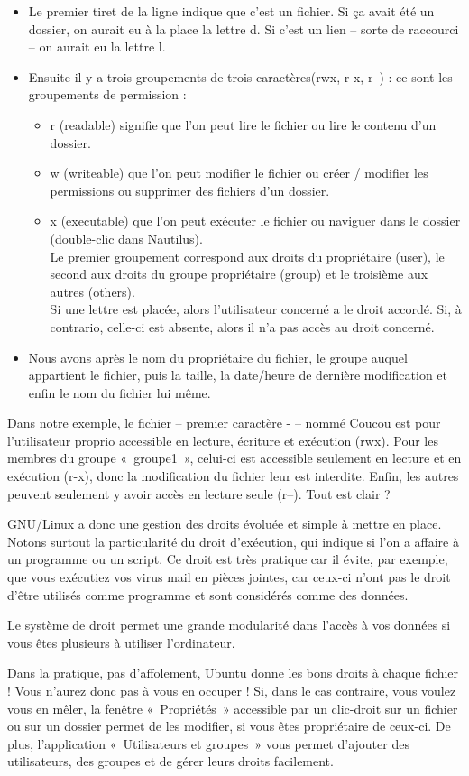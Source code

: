 \begin{itemize}
\item Le premier tiret de la ligne indique que c'est un fichier. Si ça avait été un dossier, on aurait eu à la place la lettre d. Si c'est un lien -- sorte de raccourci -- on aurait eu la lettre l.
\item Ensuite il y a trois groupements de trois caractères(rwx, r-x, r--) : ce sont les groupements de permission :
\begin{itemize}
\item r (readable) signifie que l'on peut lire le fichier ou lire le contenu d'un dossier.
\item w (writeable) que l'on peut modifier le fichier ou créer / modifier les permissions ou supprimer des fichiers d'un dossier.
\item x (executable) que l'on peut exécuter le fichier ou naviguer dans le dossier (double-clic dans Nautilus).\\
Le premier groupement correspond aux droits du propriétaire (user), le second aux droits du groupe propriétaire (group) et le troisième aux autres (others).\\
Si une lettre est placée, alors l'utilisateur concerné a le droit accordé. Si, à contrario, celle-ci est absente, alors il n'a pas accès au droit concerné.
\end{itemize}
\item Nous avons après le nom du propriétaire du fichier, le groupe auquel appartient le fichier, puis la taille, la date/heure de dernière modification et enfin le nom du fichier lui même. 
\end{itemize}
Dans notre exemple, le fichier -- premier caractère - -- nommé Coucou est pour l'utilisateur proprio accessible en lecture, écriture et exécution (rwx). Pour les membres du groupe «~groupe1~», celui-ci est accessible seulement en lecture et en exécution (r-x), donc la modification du fichier leur est interdite. Enfin, les autres peuvent seulement y avoir accès en lecture seule (r--). Tout est clair ?\par
GNU/Linux a donc une gestion des droits évoluée et simple à mettre en place. Notons surtout la particularité du droit d'exécution, qui indique si l'on a affaire à un programme ou un script. Ce droit est très pratique car il évite, par exemple, que vous exécutiez vos virus mail en pièces jointes, car ceux-ci n'ont pas le droit d'être utilisés comme programme et sont considérés comme des données.\par
Le système de droit permet une grande modularité dans l'accès à vos données si vous êtes plusieurs à utiliser l'ordinateur.
\begin{nota}
Dans la pratique, pas d'affolement, Ubuntu donne les bons droits à chaque fichier ! Vous n'aurez donc pas à vous en occuper ! Si, dans le cas contraire, vous voulez vous en mêler, la fenêtre «~Propriétés~» accessible par un clic-droit sur un fichier ou sur un dossier permet de les modifier, si vous êtes propriétaire de ceux-ci. De plus, l'application «~Utilisateurs et groupes~» vous permet d'ajouter des utilisateurs, des groupes et de gérer leurs droits facilement. 
\end{nota}
